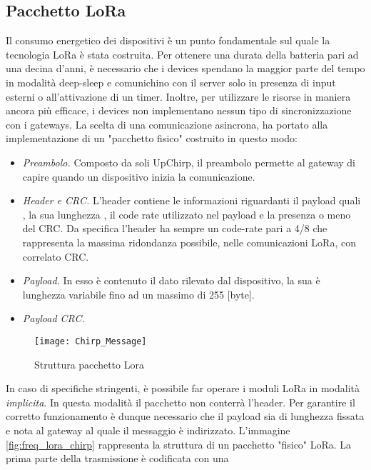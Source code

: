 \subsection{Pacchetto LoRa}
Il consumo energetico dei dispositivi è un punto fondamentale sul quale la
tecnologia LoRa è stata costruita.  Per ottenere una durata della batteria pari
ad una decina d'anni, è necessario che i devices spendano la maggior parte del
tempo in modalità deep-sleep e comunichino con il server solo in presenza di
input esterni o all'attivazione di un timer.  Inoltre, per utilizzare
le risorse in maniera ancora più efficace, i devices non implementano nessun tipo
di sincronizzazione con i gateways. La scelta di una comunicazione asincrona, ha
portato alla implementazione di un "pacchetto fisico" costruito in questo
modo:
\begin{itemize}
        \item   \emph{Preambolo.}  Composto da soli UpChirp, il preambolo permette al gateway
                di capire quando un dispositivo inizia la comunicazione.
        \item   \emph{Header e CRC.} L'header contiene le informazioni riguardanti
                il payload quali , la sua lunghezza , il code rate utilizzato nel
                payload e la presenza o meno del CRC. Da specifica l'header ha sempre
                un code-rate pari a 4/8 che rappresenta la massima ridondanza
                possibile, nelle comunicazioni LoRa, con
                correlato CRC. 
        \item   \emph{Payload.} In esso è contenuto il dato rilevato dal
                dispositivo, la sua è  lunghezza variabile fino ad
                un massimo di 255 [byte].
        \item   \emph{Payload CRC.}
\end{itemize}
\begin{figure}[ht]
        \centering 
                \texttt{[image: Chirp\_Message]}
        \caption{Struttura pacchetto Lora }
        \label{fig:phis_pack}
\end{figure}
In caso di specifiche stringenti, è possibile far operare i moduli LoRa in
modalità \emph{implicita}. In questa modalità il pacchetto non conterrà
l'header. Per garantire il corretto funzionamento è dunque necessario che il
payload sia di lunghezza fissata e nota al gateway al quale il messaggio è
indirizzato.
L'immagine  \ref{fig:freq_lora_chirp} rappresenta la struttura di un  
pacchetto "fisico" LoRa.
La prima parte della trasmissione  è codificata con una
